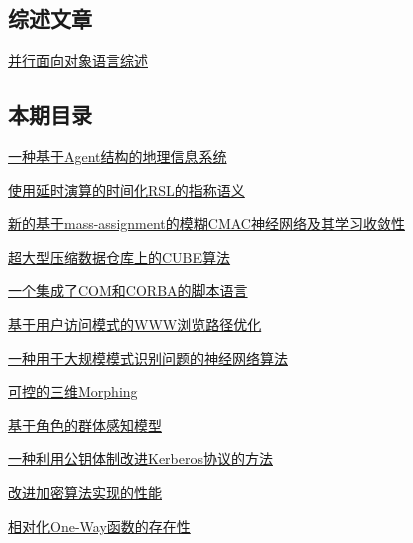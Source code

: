 \documentclass[a4paper]{article}
\begin{document}
\subsection{综述文章}
\href{http://www.jos.org.cn/ch/reader/download_pdf.aspx?file_no=20010604&year_id=2001&quarter_id=6&falg=1}{并行面向对象语言综述}

\subsection{本期目录}
\href{http://www.jos.org.cn/ch/reader/download_pdf.aspx?file_no=20010601&year_id=2001&quarter_id=6&falg=1}{一种基于Agent结构的地理信息系统}

\href{http://www.jos.org.cn/ch/reader/download_pdf.aspx?file_no=20010602&year_id=2001&quarter_id=6&falg=1}{使用延时演算的时间化RSL的指称语义}

\href{http://www.jos.org.cn/ch/reader/download_pdf.aspx?file_no=20010603&year_id=2001&quarter_id=6&falg=1}{新的基于mass-assignment的模糊CMAC神经网络及其学习收敛性}

\href{http://www.jos.org.cn/ch/reader/download_pdf.aspx?file_no=20010605&year_id=2001&quarter_id=6&falg=1}{超大型压缩数据仓库上的CUBE算法}

\href{http://www.jos.org.cn/ch/reader/download_pdf.aspx?file_no=20010606&year_id=2001&quarter_id=6&falg=1}{一个集成了COM和CORBA的脚本语言}

\href{http://www.jos.org.cn/ch/reader/download_pdf.aspx?file_no=20010607&year_id=2001&quarter_id=6&falg=1}{基于用户访问模式的WWW浏览路径优化}

\href{http://www.jos.org.cn/ch/reader/download_pdf.aspx?file_no=20010608&year_id=2001&quarter_id=6&falg=1}{一种用于大规模模式识别问题的神经网络算法}

\href{http://www.jos.org.cn/ch/reader/download_pdf.aspx?file_no=20010609&year_id=2001&quarter_id=6&falg=1}{可控的三维Morphing}

\href{http://www.jos.org.cn/ch/reader/download_pdf.aspx?file_no=20010610&year_id=2001&quarter_id=6&falg=1}{基于角色的群体感知模型}

\href{http://www.jos.org.cn/ch/reader/download_pdf.aspx?file_no=20010611&year_id=2001&quarter_id=6&falg=1}{一种利用公钥体制改进Kerberos协议的方法}

\href{http://www.jos.org.cn/ch/reader/download_pdf.aspx?file_no=20010612&year_id=2001&quarter_id=6&falg=1}{改进加密算法实现的性能}

\href{http://www.jos.org.cn/ch/reader/download_pdf.aspx?file_no=20010613&year_id=2001&quarter_id=6&falg=1}{相对化One-Way函数的存在性}
\end{document}

